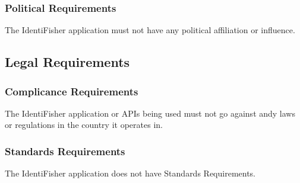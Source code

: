 \documentclass{article}
\begin{document}
\subsubsection{Political Requirements}
The IdentiFisher application must not have any political affiliation or influence.

\subsection{Legal Requirements}
\subsubsection{Complicance Requirements}
The IdentiFisher application or APIs being used must not go against andy laws or regulations in the country it operates in.
\subsubsection{Standards Requirements}
The IdentiFisher application does not have Standards Requirements.

\newpage
\listoffigures
\end{document}
